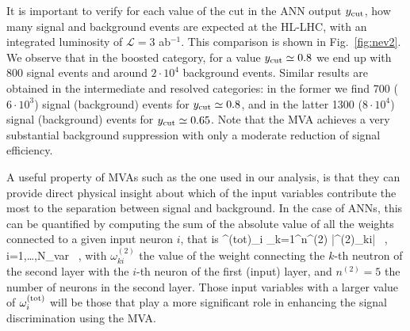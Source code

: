 It is important to verify for each value of
the cut in the ANN output $y_{\rm cut}$, how many
signal and background events are expected at the HL-LHC,
with an integrated luminosity of $\mathcal{L}=3$ ab$^{-1}$.
%
This comparison is shown in 
Fig.~\ref{fig:nev2}.
%
We observe that
in the boosted category, for a value $y_{\rm cut}\simeq 0.8$
we end up with 800 signal events and around $2\cdot 10^4$ background
events.
%
Similar results are obtained in the intermediate and resolved
categories: in the former we find 700 ($6\cdot 10^3$) signal (background)
events for $y_{\rm cut}\simeq 0.8$, and in the latter
1300 ($8\cdot 10^4$) signal (background) events for
$y_{\rm cut}\simeq 0.65$.
%
Note that the MVA achieves a very substantial background suppression
with only a
moderate reduction of signal efficiency.


A useful property of MVAs such as the one used in our
analysis,
is that they can provide direct  physical insight about which of the
input variables contribute the most to the separation between
signal and background.
%
In the case of ANNs, this can be quantified by computing the sum
of the absolute value of all the weights connected to a given
input neuron $i$, that is
\be
\label{eq:totweight}
\omega^{\rm (tot)}_i \equiv \sum_{k=1}^{n^{(2)}} \Big|\omega^{(2)}_{ki}\Big| \, ,
\qquad i=1,\ldots,N_{\rm var} \, ,
\ee
with $\omega^{(2)}_{ki}$ the value of the weight connecting
the $k$-th neutron of the second layer with the $i$-th neuron of
the first (input) layer, and $n^{(2)}=5$ the number of
neurons in the second layer.
%
Those input variables with a larger value of $\omega^{\rm (tot)}_i$ will be those
that play a more significant role in enhancing the signal
discrimination using the MVA.


